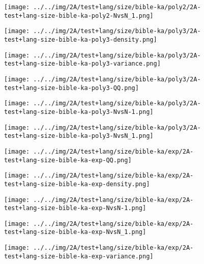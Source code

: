 \begin{figure}[H]
\centering	\texttt{[image: ../../img/2A/test+lang/size/bible-ka/poly2/2A-test+lang-size-bible-ka-poly2-NvsN\_1.png]}
\end{figure}
\begin{figure}[H]
\centering	\texttt{[image: ../../img/2A/test+lang/size/bible-ka/poly3/2A-test+lang-size-bible-ka-poly3-density.png]}
\end{figure}
\begin{figure}[H]
\centering	\texttt{[image: ../../img/2A/test+lang/size/bible-ka/poly3/2A-test+lang-size-bible-ka-poly3-variance.png]}
\end{figure}
\begin{figure}[H]
\centering	\texttt{[image: ../../img/2A/test+lang/size/bible-ka/poly3/2A-test+lang-size-bible-ka-poly3-QQ.png]}
\end{figure}
\begin{figure}[H]
\centering	\texttt{[image: ../../img/2A/test+lang/size/bible-ka/poly3/2A-test+lang-size-bible-ka-poly3-NvsN-1.png]}
\end{figure}
\begin{figure}[H]
\centering	\texttt{[image: ../../img/2A/test+lang/size/bible-ka/poly3/2A-test+lang-size-bible-ka-poly3-NvsN\_1.png]}
\end{figure}
\begin{figure}[H]
\centering	\texttt{[image: ../../img/2A/test+lang/size/bible-ka/exp/2A-test+lang-size-bible-ka-exp-QQ.png]}
\end{figure}
\begin{figure}[H]
\centering	\texttt{[image: ../../img/2A/test+lang/size/bible-ka/exp/2A-test+lang-size-bible-ka-exp-density.png]}
\end{figure}
\begin{figure}[H]
\centering	\texttt{[image: ../../img/2A/test+lang/size/bible-ka/exp/2A-test+lang-size-bible-ka-exp-NvsN-1.png]}
\end{figure}
\begin{figure}[H]
\centering	\texttt{[image: ../../img/2A/test+lang/size/bible-ka/exp/2A-test+lang-size-bible-ka-exp-NvsN\_1.png]}
\end{figure}
\begin{figure}[H]
\centering	\texttt{[image: ../../img/2A/test+lang/size/bible-ka/exp/2A-test+lang-size-bible-ka-exp-variance.png]}
\end{figure}
